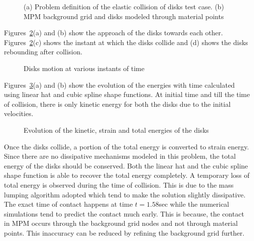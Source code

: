 \begin{figure}[h]
\caption{(a) Problem definition of the elastic collision of disks test case. (b) MPM background grid and disks modeled through material points}
\label{Fig:TestCaseEDC}
\end{figure}

Figures~\ref{Fig:TestCaseEDC_Res1}(a) and (b) show the approach of the disks towards each other.  Figures~\ref{Fig:TestCaseEDC_Res1}(c) shows the instant at which the disks collide and (d) shows the disks rebounding after collision. 

\begin{figure}[h]
\caption{Disks motion at various instants of time}
\label{Fig:TestCaseEDC_Res1}
\end{figure}

Figures~\ref{Fig:TestCaseEDC_Res2}(a) and (b) show the evolution of the energies with time calculated using linear hat and cubic spline shape functions. At initial time and till the time of collision, there is only kinetic energy for both the disks due to the initial velocities. 

\begin{figure}[h]
\caption{Evolution of the kinetic, strain and total energies of the disks}
\label{Fig:TestCaseEDC_Res2}
\end{figure}

Once the disks collide, a portion of the total energy is converted to strain energy. Since there are no dissipative mechanisms modeled in this problem, the total energy of the disks should be conserved. Both the linear hat and the cubic spline shape function is able to recover the total energy completely. A temporary loss of total energy is observed during the time of collision. This is due to the mass lumping algorithm adopted which tend to make the solution slightly dissipative. The exact time of contact happens at time $t=1.58$sec while the numerical simulations tend to predict the contact much early. This is because, the contact in MPM occurs through the background grid nodes and not through material points. This inaccuracy can be reduced by refining the background grid further.

